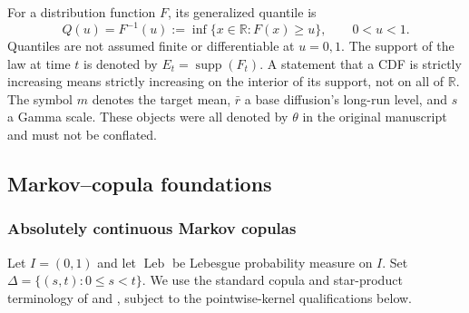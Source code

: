 \documentclass[11pt]{article}
\theoremstyle{remark}
\newcommand{\R}{\mathbb R}
\newcommand{\supp}{\operatorname{supp}}
\newcommand{\Leb}{\operatorname{Leb}}
\begin{document}
For a distribution function $F$, its generalized quantile is
\begin{equation}
Q(u)=F^{-1}(u):=\inf\{x\in\R:F(x)\ge u\},\qquad 0<u<1.
\label{rev:quantile}
\end{equation}
Quantiles are not assumed finite or differentiable at $u=0,1$.  The support of
the law at time $t$ is denoted by $E_t=\supp(F_t)$.  A statement that a CDF is
strictly increasing means strictly increasing on the interior of its support,
not on all of $\R$.  The symbol $m$ denotes the target mean, $\bar r$ a base
diffusion's long-run level, and $s$ a Gamma scale.  These objects were all denoted
by $\theta$ in the original manuscript and must not be conflated.

\subsection{Markov--copula foundations}

\subsubsection{Absolutely continuous Markov copulas}

Let $I=(0,1)$ and let $\Leb$ be Lebesgue probability measure on $I$.
Set $\Delta=\{(s,t):0\le s<t\}$.
We use the standard copula and star-product terminology of
\citet{Nelsen2006} and \citet{DarsowNguyenOlsen1992}, subject to the
pointwise-kernel qualifications below.
\end{document}
